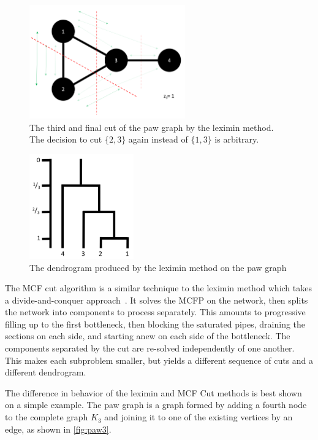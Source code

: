 \begin{figure}
\centering
\includegraphics[width=0.6\textwidth]{fig/level3}
\caption{The third and final cut of the paw graph by the leximin method. The decision to cut $\{2, 3\}$ again instead of $\{1, 3\}$ is arbitrary.}
\label{fig:level3}
\end{figure}

\begin{figure}
\centering
\includegraphics[width=0.4\textwidth]{fig/dendrogram_4_cascade}
\caption{The dendrogram produced by the leximin method on the paw graph}
\label{fig:leximin_dendrogram}
\end{figure}

The MCF cut algorithm is a similar technique to the leximin method which takes a divide-and-conquer approach~\cite{mann2008extensions}. It solves the MCFP on the network, then splits the network into components to process separately. This amounts to progressive filling up to the first bottleneck, then blocking the saturated pipes, draining the sections on each side, and starting anew on each side of the bottleneck. The components separated by the cut are re-solved independently of one another. This makes each subproblem smaller, but yields a different sequence of cuts and a different dendrogram.

The difference in behavior of the leximin and MCF Cut methods is best shown on a simple example. The paw graph is a graph formed by adding a fourth node to the complete graph $K_3$ and joining it to one of the existing vertices by an edge, as shown in \autoref{fig:paw3}.

